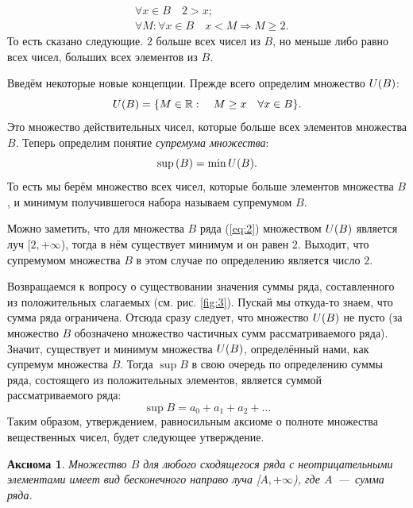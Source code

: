 \documentclass[12pt]{article}
\newtheorem{axiom}{Аксиома}[section]
\begin{document}
\begin{equation}
    \begin{split}
        &\forall x \in B \quad 2>x;\\
        &\forall M: \forall x \in B \quad x<M \Longrightarrow M \ge 2.
    \end{split}
\end{equation}
То есть сказано следующие. $2$ больше всех чисел из $B$, но меньше либо равно всех чисел, больших всех элементов из $B$.
\par
Введём некоторые новые концепции. Прежде всего определим множество $U\qty(B)$:
\begin{equation}
    U\qty(B) = \qty{M \in \mathbb{R}:\quad M \ge x \quad \forall x\in B}.
\end{equation}
Это множество действительных чисел, которые больше всех элементов множества $B$. Теперь определим понятие \emph{супремума множества}:
\begin{equation}
    \sup\qty(B) = \min U\qty(B).
\end{equation}
То есть мы берём множество всех чисел, которые больше элементов множества $B$, и минимум получившегося набора называем супремумом $B$.
\par
Можно заметить, что для множества $B$ ряда (\ref{eq:2}) множеством $U\qty(B)$ является луч [$2,+\infty$), тогда в нём существует минимум и он равен $2$. Выходит, что супремумом множества $B$ в этом случае по определению является число $2$.
\par
Возвращаемся к вопросу о существовании значения суммы ряда, составленного из положительных слагаемых (см. рис. \ref{fig:3}). Пускай мы откуда\--то знаем, что сумма ряда ограничена. Отсюда сразу следует, что множество $U\qty(B)$ не пусто (за множество $B$ обозначено множество частичных сумм рассматриваемого ряда). Значит, существует и минимум множества $U\qty(B)$, определённый нами, как супремум множества $B$. Тогда $\sup B$ в свою очередь по определению суммы ряда, состоящего из положительных элементов, является суммой рассматриваемого ряда:
\begin{equation}
    \sup B = a_0 + a_1 + a_2 + \ldots
\end{equation}
Таким образом, утверждением, равносильным аксиоме о полноте множества вещественных чисел, будет следующее утверждение. 
\begin{axiom}
{Множество $B$ для любого сходящегося ряда с неотрицательными элементами имеет вид бесконечного направо луча [$A,+\infty$), где $A$~\----~сумма ряда}.
\end{axiom}
\end{document}
